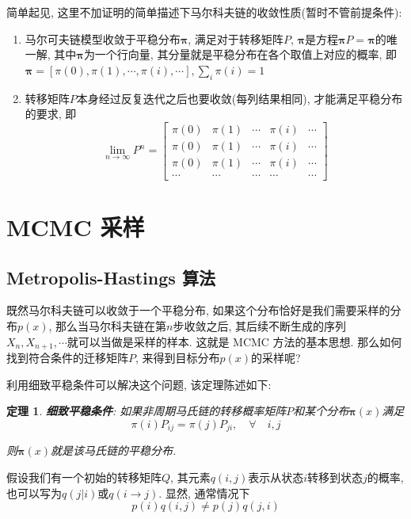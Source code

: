 \documentclass[a4paper,UTF8]{ctexart}
\theoremstyle{plain} \newtheorem{theorem}{定理}[section]
\theoremstyle{plain} \newtheorem{definition}{定义}[section]
\theoremstyle{plain} \newtheorem{lemma}{引理}[section]
\theoremstyle{plain} \newtheorem{proposition}{命题}[section]
\theoremstyle{plain} \newtheorem{example}{例}[section]
\theoremstyle{plain} \newtheorem{remark}{注}[section]
\theoremstyle{plain} \newtheorem{corollary}{推论}[section]
\begin{document}
简单起见, 这里不加证明的简单描述下马尔科夫链的收敛性质(暂时不管前提条件):
\begin{enumerate}[(1)]
\item 马尔可夫链模型收敛于平稳分布$\bm{\pi}$, 满足对于转移矩阵$P$, $\bm{\pi}$是方程$\bm{\pi} P = \bm{\pi}$的唯一解, 其中$\bm{\pi}$为一个行向量, 其分量就是平稳分布在各个取值上对应的概率, 即$\bm{\pi} = [\pi(0), \pi(1), \cdots, \pi(i), \cdots], \sum_{i} \pi(i) = 1$

\item 转移矩阵$P$本身经过反复迭代之后也要收敛(每列结果相同), 才能满足平稳分布的要求, 即
$$
\lim_{n \rightarrow \infty} P^{n} = 
\begin{bmatrix}
\pi(0) & \pi(1) & \cdots & \pi(i) & \cdots \\ 
\pi(0) & \pi(1) & \cdots & \pi(i) & \cdots \\ 
\pi(0) & \pi(1) & \cdots & \pi(i) & \cdots \\ 
\cdots & \cdots & \cdots & \cdots & \cdots 
\end{bmatrix}
$$

\end{enumerate}



\section{MCMC 采样}
\subsection{Metropolis-Hastings 算法}
既然马尔科夫链可以收敛于一个平稳分布, 如果这个分布恰好是我们需要采样的分布$p(x)$, 那么当马尔科夫链在第$n$步收敛之后, 其后续不断生成的序列$X_{n}, X_{n+1}, \cdots$就可以当做是采样的样本. 这就是 MCMC 方法的基本思想. 那么如何找到符合条件的迁移矩阵$P$, 来得到目标分布$p(x)$的采样呢?

利用细致平稳条件可以解决这个问题, 该定理陈述如下:
\begin{theorem}
\textbf{细致平稳条件}: 如果非周期马氏链的转移概率矩阵$P$和某个分布$\bm{\pi}(x)$满足
\begin{equation*}
\pi(i) P_{ij} = \pi(j) P_{ji}, \quad \forall \quad i, j 
\end{equation*}

则$\bm{\pi}(x)$就是该马氏链的平稳分布.

\end{theorem}

假设我们有一个初始的转移矩阵$Q$, 其元素$q(i, j)$表示从状态$i$转移到状态$j$的概率, 也可以写为$q(j | i)$或$q(i \rightarrow j)$. 显然, 通常情况下
\begin{equation*}
p(i) q(i,j) \neq p(j) q(j,i)
\end{equation*}
\end{document}
